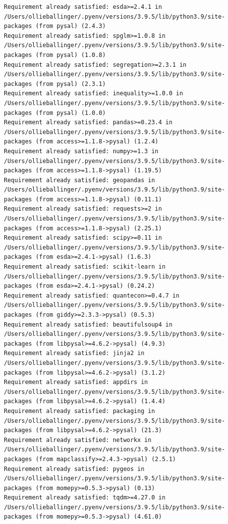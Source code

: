 \documentclass[
  letterpaper,
  DIV=11,
  numbers=noendperiod]{scrreprt}
\begin{document}
\begin{verbatim}
Requirement already satisfied: esda>=2.4.1 in /Users/ollieballinger/.pyenv/versions/3.9.5/lib/python3.9/site-packages (from pysal) (2.4.3)
Requirement already satisfied: spglm>=1.0.8 in /Users/ollieballinger/.pyenv/versions/3.9.5/lib/python3.9/site-packages (from pysal) (1.0.8)
Requirement already satisfied: segregation>=2.3.1 in /Users/ollieballinger/.pyenv/versions/3.9.5/lib/python3.9/site-packages (from pysal) (2.3.1)
Requirement already satisfied: inequality>=1.0.0 in /Users/ollieballinger/.pyenv/versions/3.9.5/lib/python3.9/site-packages (from pysal) (1.0.0)
Requirement already satisfied: pandas>=0.23.4 in /Users/ollieballinger/.pyenv/versions/3.9.5/lib/python3.9/site-packages (from access>=1.1.8->pysal) (1.2.4)
Requirement already satisfied: numpy>=1.3 in /Users/ollieballinger/.pyenv/versions/3.9.5/lib/python3.9/site-packages (from access>=1.1.8->pysal) (1.19.5)
Requirement already satisfied: geopandas in /Users/ollieballinger/.pyenv/versions/3.9.5/lib/python3.9/site-packages (from access>=1.1.8->pysal) (0.11.1)
Requirement already satisfied: requests>=2 in /Users/ollieballinger/.pyenv/versions/3.9.5/lib/python3.9/site-packages (from access>=1.1.8->pysal) (2.25.1)
Requirement already satisfied: scipy>=0.11 in /Users/ollieballinger/.pyenv/versions/3.9.5/lib/python3.9/site-packages (from esda>=2.4.1->pysal) (1.6.3)
Requirement already satisfied: scikit-learn in /Users/ollieballinger/.pyenv/versions/3.9.5/lib/python3.9/site-packages (from esda>=2.4.1->pysal) (0.24.2)
Requirement already satisfied: quantecon>=0.4.7 in /Users/ollieballinger/.pyenv/versions/3.9.5/lib/python3.9/site-packages (from giddy>=2.3.3->pysal) (0.5.3)
Requirement already satisfied: beautifulsoup4 in /Users/ollieballinger/.pyenv/versions/3.9.5/lib/python3.9/site-packages (from libpysal>=4.6.2->pysal) (4.9.3)
Requirement already satisfied: jinja2 in /Users/ollieballinger/.pyenv/versions/3.9.5/lib/python3.9/site-packages (from libpysal>=4.6.2->pysal) (3.1.2)
Requirement already satisfied: appdirs in /Users/ollieballinger/.pyenv/versions/3.9.5/lib/python3.9/site-packages (from libpysal>=4.6.2->pysal) (1.4.4)
Requirement already satisfied: packaging in /Users/ollieballinger/.pyenv/versions/3.9.5/lib/python3.9/site-packages (from libpysal>=4.6.2->pysal) (21.3)
Requirement already satisfied: networkx in /Users/ollieballinger/.pyenv/versions/3.9.5/lib/python3.9/site-packages (from mapclassify>=2.4.3->pysal) (2.5.1)
Requirement already satisfied: pygeos in /Users/ollieballinger/.pyenv/versions/3.9.5/lib/python3.9/site-packages (from momepy>=0.5.3->pysal) (0.13)
Requirement already satisfied: tqdm>=4.27.0 in /Users/ollieballinger/.pyenv/versions/3.9.5/lib/python3.9/site-packages (from momepy>=0.5.3->pysal) (4.61.0)

\end{verbatim}
\end{document}

